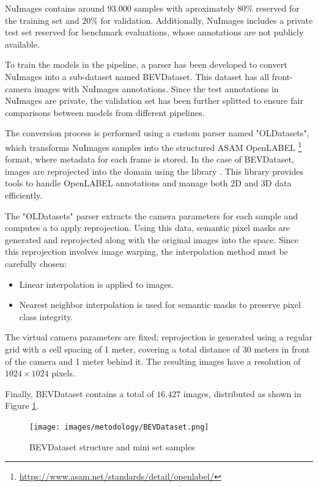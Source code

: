 NuImages contains around $93.000$ samples with aproximately $80\%$ reserved for the training set and $20\%$ for validation. Additionally, NuImages includes a private test set reserved for benchmark evaluations, whose annotations are not publicly available.

To train the models in the pipeline, a parser has been developed to convert NuImages into a sub-dataset named BEVDataset. This dataset has all front-camera images with NuImages annotations. Since the test annotations in NuImages are private, the validation set has been further splitted to ensure fair comparisons between models from different pipelines.

The conversion process is performed using a custom parser named "OLDatasets", which transforms NuImages samples into the structured ASAM OpenLABEL \footnote{\url{https://www.asam.net/standards/detail/openlabel/}} format, where metadata for each frame is stored. In the case of BEVDataset, images are reprojected into the  domain using the  library \cite{VCD}. This library provides tools to handle OpenLABEL annotations and manage both 2D and 3D data efficiently.

The "OLDatasets" parser extracts the camera parameters for each sample and computes a  to apply  reprojection. Using this data, semantic pixel masks are generated and reprojected along with the original images into the  space. Since this reprojection involves image warping, the interpolation method must be carefully chosen:
\begin{itemize}
    \item Linear interpolation is applied to images.
    \item Nearest neighbor interpolation is used for semantic masks to preserve pixel class integrity. 
\end{itemize}

The virtual  camera parameters are fixed:  reprojection is generated using a regular grid with a cell spacing of 1 meter, covering a total distance of 30 meters in front of the camera and 1 meter behind it. The resulting images have a resolution of $1024 \times 1024$ pixels.

Finally, BEVDataset contains a total of $16.427$ images, distributed as shown in Figure \ref{fig:bev_dataset}.

\begin{figure}[h!]
    \centering
    \texttt{[image: images/metodology/BEVDataset.png]}
    \caption{BEVDataset structure and mini set samples}
    \label{fig:bev_dataset}
\end{figure}



